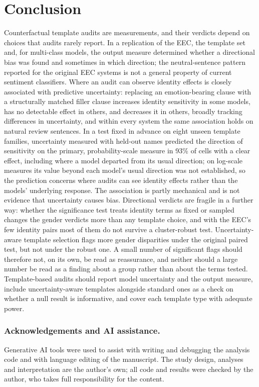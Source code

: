 \documentclass[runningheads]{llncs}
\begin{document}
\section{Conclusion}
Counterfactual template audits are measurements, and their verdicts depend on
choices that audits rarely report. In a replication of the EEC, the template set
and, for multi-class models, the output measure determined whether a
directional bias was found and sometimes in which direction; the
neutral-sentence pattern reported for the original EEC systems is not a general
property of current sentiment classifiers. Where an audit can observe identity
effects is closely associated with predictive uncertainty: replacing an
emotion-bearing clause with a structurally matched filler clause increases
identity sensitivity in some models, has no detectable effect in others, and
decreases it in others, broadly tracking differences in uncertainty, and within
every system the same association holds on natural review sentences. In a test
fixed in advance on eight unseen template families, uncertainty measured with
held-out names predicted the direction of sensitivity on the primary,
probability-scale measure in 93\% of cells with a clear effect, including where
a model departed from its usual direction; on log-scale measures its value
beyond each model's usual direction was not established, so the prediction concerns where audits can see identity effects
rather than the models' underlying response. The association is partly mechanical and is
not evidence that uncertainty causes bias. Directional verdicts are fragile in
a further way: whether the significance test treats identity terms as fixed
or sampled changes the gender verdicts more than any template choice, and with
the EEC's few identity pairs most of them do not survive a cluster-robust test.
Uncertainty-aware template selection flags more gender disparities under the
original paired test, but not under the robust one. A small number of
significant flags should therefore not, on its own, be read as
reassurance, and neither should a large number be read as a finding about a
group rather than about the terms tested. Template-based audits should report model uncertainty and
the output measure, include uncertainty-aware templates alongside standard ones
as a check on whether a null result is informative, and cover each template type
with adequate power.

\subsubsection*{Acknowledgements and AI assistance.}
Generative AI tools were used to assist with writing and debugging the analysis
code and with language editing of the manuscript. The study design, analyses
and interpretation are the author's own; all code and results were checked by
the author, who takes full responsibility for the content.
\end{document}
